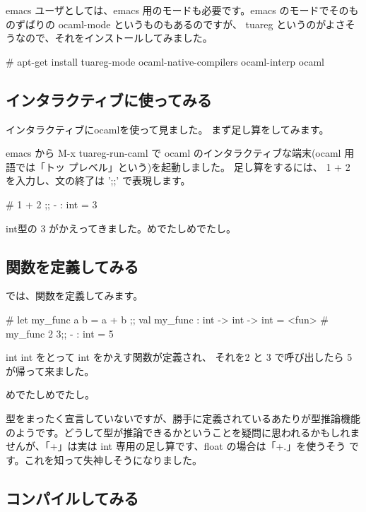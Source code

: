 \documentclass[mingoth,a4paper]{jsarticle}
\begin{document}
emacs ユーザとしては、emacs 用のモードも必要です。emacs のモードでそのも
のずばりの ocaml-mode というものもあるのですが、 tuareg というのがよさそ
うなので、それをインストールしてみました。

\begin{commandline}
# apt-get install tuareg-mode ocaml-native-compilers ocaml-interp ocaml
\end{commandline}

\subsection{インタラクティブに使ってみる}

インタラクティブにocamlを使って見ました。
まず足し算をしてみます。

emacs から M-x tuareg-run-caml で ocaml のインタラクティブな端末(ocaml 用語では「トッ
プレベル」という)を起動しました。
足し算をするには、 1 + 2 を入力し、文の終了は ';;' で表現します。

\begin{commandline}
# 1 + 2 ;;
- : int = 3
\end{commandline}

int型の 3 がかえってきました。めでたしめでたし。

\subsection{関数を定義してみる}

では、関数を定義してみます。

\begin{commandline}
# let my_func a b = a + b ;;
val my_func : int -> int -> int = <fun>
# my_func 2 3;;
- : int = 5
\end{commandline}

int int をとって int をかえす関数が定義され、
それを2 と 3 で呼び出したら 5 が帰って来ました。

めでたしめでたし。

型をまったく宣言していないですが、勝手に定義されているあたりが型推論機能
のようです。どうして型が推論できるかということを疑問に思われるかもしれま
せんが、「+」は実は int 専用の足し算です、float の場合は「+.」を使うそう
です。これを知って失神しそうになりました。

\subsection{コンパイルしてみる}
\end{document}
